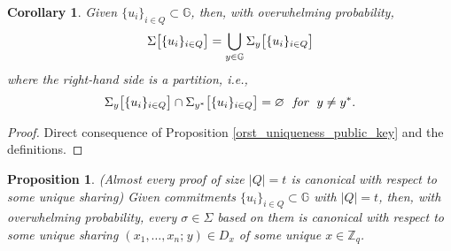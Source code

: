 \documentclass[psamsfonts, reqno]{amsart}
\newtheorem{cor}[thm]{Corollary}
\newtheorem{prop}[thm]{Proposition}
\theoremstyle{definition}
\theoremstyle{remark}
\numberwithin{equation}{section}
\begin{document}
\begin{cor}\label{orst_validity_classes_prop}
Given $\{u_i\}_{i \in Q} \subset \mathbb{G}$,
then, with overwhelming probability,
\vspace{5pt}
\begin{equation}\label{orst_validity_classes_union}
\Sigma\big[\{u_i\}_{i \in Q}\big]
=
\bigcup_{y \in \mathbb{G}} \Sigma_y\big[\{u_i\}_{i \in Q}\big]
\vspace{3pt}
\end{equation}
where the right-hand side is a partition, i.e.,
\vspace{7pt}
\begin{equation*}
\Sigma_y\big[\{u_i\}_{i \in Q}\big]
\cap
\Sigma_{y^*}\big[\{u_i\}_{i \in Q}\big]
= \varnothing
\ \textit{ for }\ y \neq y^*.
\vspace{7pt}
\end{equation*}
\end{cor}

\begin{proof}
Direct consequence of Proposition \ref{orst_uniqueness_public_key}
and the definitions.
\end{proof}

\begin{prop}\label{orst_uniqueness_sharing}
\textup{(\textit{Almost every proof of size $|Q| = t$
is canonical with respect to some unique sharing})}
Given commitments
$\{u_i\}_{i \in Q} \subset \mathbb{G}$ with $|Q| = t$,
then, with overwhelming probability,
every $\sigma \in \Sigma$ based on them
is canonical with respect to some unique sharing
$(x_1, \dots, x_n;\hspace{1pt} y) \in D_x$
of some unique $x \in \mathbb{Z}_q$.
\end{prop}
\end{document}
